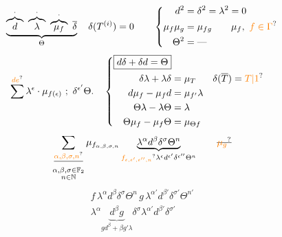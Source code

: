 \[
 \underbrace{\overbrace d^{\cdot}\ \overbrace\lambda^{\cdot}\
             \overbrace{\mu_f}^{\cdot}\ \overline\delta}_{\Theta}
 \quad \delta(T^{(i)})=0\qquad
 \left\{\begin{aligned}
 d^2&=\delta^2=\lambda^2=0\\
 \mu_{f}\mu_{g}&=\mu_{fg}\qquad \mu_f,\ \unsure{f\in\Gamma}\\
 \Theta^2&=\text{---}
 \end{aligned}\right.
\]
\[
 \sum^{\unsure{de}}\lambda^\epsilon\cdot\mu_{f(\epsilon)}\ ;\ \delta^{\epsilon'}\Theta.
 \quad
 \left\{\begin{aligned}
 \boxed{d\delta+\delta d=\Theta}&\\
 \delta\lambda+\lambda\delta&=\mu_T && \delta(\overline T)=\unsure{T|1}\\
 d\mu_f-\mu_f d&=\mu_{f'}\lambda\\
 \Theta\lambda-\lambda\Theta&=\lambda\\
 \Theta\mu_f-\mu_f\Theta&=\mu_{\Theta f}
 \end{aligned}\right.
\]
\[
 \sum_{\substack{\deleted{\unsure{\alpha,\beta,\sigma,n}}\\
  \alpha,\beta,\sigma\in\mathbb F_2\\n\in\mathbb N}}
 \mu_{f_{\alpha,\beta,\sigma,n}}\underbrace{\lambda^\alpha d^\beta\delta^\sigma\Theta^n}_{
 \unsure{f_{\epsilon,\epsilon',\epsilon'',n}}\lambda^\epsilon d^{\epsilon'}\delta^{\epsilon''}\Theta^n}
 \qquad\deleted{\unsure{\mu_g}}
\]
\[
 \begin{aligned}
 f\,\lambda^\alpha d^\beta\delta^\sigma\Theta^n\,g\,
 \lambda^{\alpha'}d^{\beta'}\delta^{\sigma'}\Theta^{n'}\\
 \lambda^\alpha
 \underbrace{d^\beta g}_{g d^\beta+\beta g'\lambda}
 \delta^\sigma\lambda^{\alpha'}d^{\beta'}\delta^{\sigma'}
 \end{aligned}
\]

